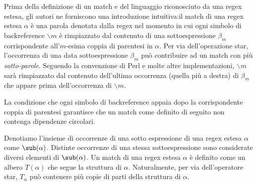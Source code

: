 Prima della definizione di un match e del linguaggio riconosciuto da una regex estesa, gli autori ne forniscono una introduzione intuitiva:il match di una regex estesa $\alpha$ è una parola denotata dalla regex nel momento in cui ogni simbolo di backreference $\backslash m$ è rimpiazzato dal contenuto di una sottoespressione $\beta_m$ corrispondente all'$m$-esima coppia di parentesi in $\alpha$. Per via dell'operazione star, l'occorrenza di una data sottoespressione $\beta_m$ può contribuire ad un match con più \textit{sotto-parole}. Seguendo la convenzione di Perl e molte altre implementazioni, $\backslash m$ sarà rimpiazzato dal contenuto dell'ultima occorrenza (quella più a destra) di $\beta_m$ che appare prima dell'occorrenza di $\backslash m$.

La condizione che ogni simbolo di backreference appaia dopo la corrispondente coppia di parentesi garantisce che un match come definito di seguito non contenga dipendenze circolari.

Denotiamo l'insieme di occorrenze di una sotto espressione di una regex estesa $\alpha$ come $\sub(\alpha)$. Distinte occorrenze di una stessa sottoespressione sono considerate diversi elementi di $\sub(\alpha)$. Un match di una regex estesa $\alpha$ è definito come un albero $T(\alpha)$ che segue la struttura di $\alpha$. Naturalmente, per via dell'operatore star, $T_{\alpha}$ può contenere più copie di parti della struttura di $\alpha$.

